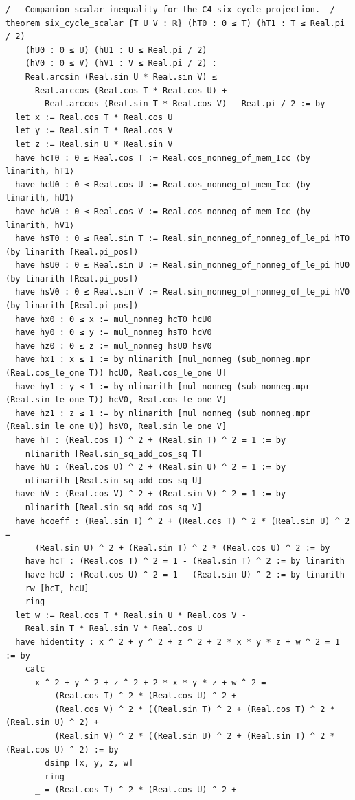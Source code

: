 \documentclass[11pt,a4paper]{article}
\begin{document}
\begin{Verbatim}[breaklines,breakanywhere,fontsize=\footnotesize]
/-- Companion scalar inequality for the C4 six-cycle projection. -/
theorem six_cycle_scalar {T U V : ℝ} (hT0 : 0 ≤ T) (hT1 : T ≤ Real.pi / 2)
    (hU0 : 0 ≤ U) (hU1 : U ≤ Real.pi / 2)
    (hV0 : 0 ≤ V) (hV1 : V ≤ Real.pi / 2) :
    Real.arcsin (Real.sin U * Real.sin V) ≤
      Real.arccos (Real.cos T * Real.cos U) +
        Real.arccos (Real.sin T * Real.cos V) - Real.pi / 2 := by
  let x := Real.cos T * Real.cos U
  let y := Real.sin T * Real.cos V
  let z := Real.sin U * Real.sin V
  have hcT0 : 0 ≤ Real.cos T := Real.cos_nonneg_of_mem_Icc ⟨by linarith, hT1⟩
  have hcU0 : 0 ≤ Real.cos U := Real.cos_nonneg_of_mem_Icc ⟨by linarith, hU1⟩
  have hcV0 : 0 ≤ Real.cos V := Real.cos_nonneg_of_mem_Icc ⟨by linarith, hV1⟩
  have hsT0 : 0 ≤ Real.sin T := Real.sin_nonneg_of_nonneg_of_le_pi hT0 (by linarith [Real.pi_pos])
  have hsU0 : 0 ≤ Real.sin U := Real.sin_nonneg_of_nonneg_of_le_pi hU0 (by linarith [Real.pi_pos])
  have hsV0 : 0 ≤ Real.sin V := Real.sin_nonneg_of_nonneg_of_le_pi hV0 (by linarith [Real.pi_pos])
  have hx0 : 0 ≤ x := mul_nonneg hcT0 hcU0
  have hy0 : 0 ≤ y := mul_nonneg hsT0 hcV0
  have hz0 : 0 ≤ z := mul_nonneg hsU0 hsV0
  have hx1 : x ≤ 1 := by nlinarith [mul_nonneg (sub_nonneg.mpr (Real.cos_le_one T)) hcU0, Real.cos_le_one U]
  have hy1 : y ≤ 1 := by nlinarith [mul_nonneg (sub_nonneg.mpr (Real.sin_le_one T)) hcV0, Real.cos_le_one V]
  have hz1 : z ≤ 1 := by nlinarith [mul_nonneg (sub_nonneg.mpr (Real.sin_le_one U)) hsV0, Real.sin_le_one V]
  have hT : (Real.cos T) ^ 2 + (Real.sin T) ^ 2 = 1 := by
    nlinarith [Real.sin_sq_add_cos_sq T]
  have hU : (Real.cos U) ^ 2 + (Real.sin U) ^ 2 = 1 := by
    nlinarith [Real.sin_sq_add_cos_sq U]
  have hV : (Real.cos V) ^ 2 + (Real.sin V) ^ 2 = 1 := by
    nlinarith [Real.sin_sq_add_cos_sq V]
  have hcoeff : (Real.sin T) ^ 2 + (Real.cos T) ^ 2 * (Real.sin U) ^ 2 =
      (Real.sin U) ^ 2 + (Real.sin T) ^ 2 * (Real.cos U) ^ 2 := by
    have hcT : (Real.cos T) ^ 2 = 1 - (Real.sin T) ^ 2 := by linarith
    have hcU : (Real.cos U) ^ 2 = 1 - (Real.sin U) ^ 2 := by linarith
    rw [hcT, hcU]
    ring
  let w := Real.cos T * Real.sin U * Real.cos V -
    Real.sin T * Real.sin V * Real.cos U
  have hidentity : x ^ 2 + y ^ 2 + z ^ 2 + 2 * x * y * z + w ^ 2 = 1 := by
    calc
      x ^ 2 + y ^ 2 + z ^ 2 + 2 * x * y * z + w ^ 2 =
          (Real.cos T) ^ 2 * (Real.cos U) ^ 2 +
          (Real.cos V) ^ 2 * ((Real.sin T) ^ 2 + (Real.cos T) ^ 2 * (Real.sin U) ^ 2) +
          (Real.sin V) ^ 2 * ((Real.sin U) ^ 2 + (Real.sin T) ^ 2 * (Real.cos U) ^ 2) := by
        dsimp [x, y, z, w]
        ring
      _ = (Real.cos T) ^ 2 * (Real.cos U) ^ 2 +

\end{Verbatim}
\end{document}
